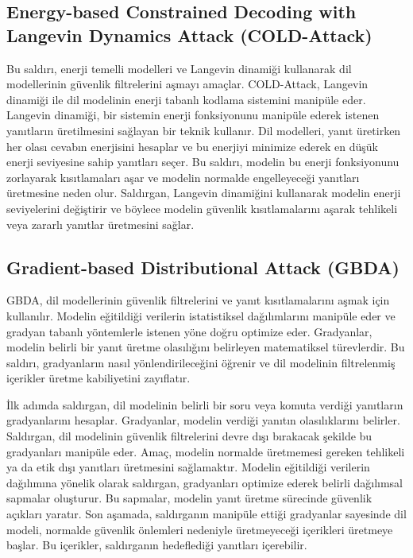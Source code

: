 \newpage

\subsection{Energy-based Constrained Decoding with Langevin Dynamics Attack (COLD-Attack)}

Bu saldırı, enerji temelli modelleri ve Langevin dinamiği kullanarak dil modellerinin güvenlik filtrelerini aşmayı amaçlar. COLD-Attack, Langevin dinamiği ile dil modelinin enerji tabanlı kodlama sistemini manipüle eder. Langevin dinamiği, bir sistemin enerji fonksiyonunu manipüle ederek istenen yanıtların üretilmesini sağlayan bir teknik kullanır. Dil modelleri, yanıt üretirken her olası cevabın enerjisini hesaplar ve bu enerjiyi minimize ederek en düşük enerji seviyesine sahip yanıtları seçer. Bu saldırı, modelin bu enerji fonksiyonunu zorlayarak kısıtlamaları aşar ve modelin normalde engelleyeceği yanıtları üretmesine neden olur. Saldırgan, Langevin dinamiğini kullanarak modelin enerji seviyelerini değiştirir ve böylece modelin güvenlik kısıtlamalarını aşarak tehlikeli veya zararlı yanıtlar üretmesini sağlar.

\newpage

\subsection{Gradient-based Distributional Attack (GBDA)}

GBDA, dil modellerinin güvenlik filtrelerini ve yanıt kısıtlamalarını aşmak için kullanılır. Modelin eğitildiği verilerin istatistiksel dağılımlarını manipüle eder ve gradyan tabanlı yöntemlerle istenen yöne doğru optimize eder. Gradyanlar, modelin belirli bir yanıt üretme olasılığını belirleyen matematiksel türevlerdir. Bu saldırı, gradyanların nasıl yönlendirileceğini öğrenir ve dil modelinin filtrelenmiş içerikler üretme kabiliyetini zayıflatır.

İlk adımda saldırgan, dil modelinin belirli bir soru veya komuta verdiği yanıtların gradyanlarını hesaplar. Gradyanlar, modelin verdiği yanıtın olasılıklarını belirler. Saldırgan, dil modelinin güvenlik filtrelerini devre dışı bırakacak şekilde bu gradyanları manipüle eder. Amaç, modelin normalde üretmemesi gereken tehlikeli ya da etik dışı yanıtları üretmesini sağlamaktır. Modelin eğitildiği verilerin dağılımına yönelik olarak saldırgan, gradyanları optimize ederek belirli dağılımsal sapmalar oluşturur. Bu sapmalar, modelin yanıt üretme sürecinde güvenlik açıkları yaratır. Son aşamada, saldırganın manipüle ettiği gradyanlar sayesinde dil modeli, normalde güvenlik önlemleri nedeniyle üretmeyeceği içerikleri üretmeye başlar. Bu içerikler, saldırganın hedeflediği yanıtları içerebilir.

